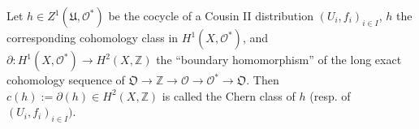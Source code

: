Let $h \in Z^1(\mathfrak{U}, \mathcal{O}^*)$ be the cocycle of a Cousin II distribution $(U_i, f_i)_{i \in I}$, $h$ the corresponding cohomology class in $H^1(X, \mathcal{O}^*)$, and $\partial: H^1(X, \mathcal{O}^*) \rightarrow H^2(X, \mathbb{Z})$ the “boundary homomorphism” of the long exact cohomology sequence of $\mathfrak{O} \rightarrow \mathbb{Z} \rightarrow \mathcal{O} \rightarrow \mathcal{O}^* \rightarrow \mathfrak{O}$. Then $c(h) := \partial(h) \in H^2(X, \mathbb{Z})$ is called the Chern class of $h$ (resp. of $(U_i, f_i)_{i \in I})$.
